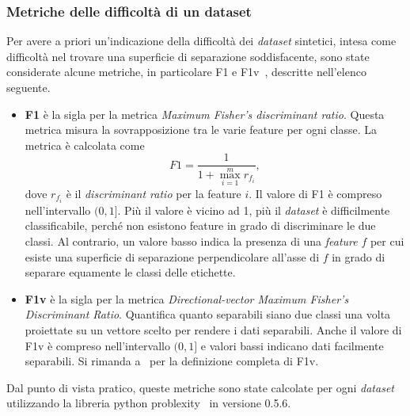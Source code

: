 \subsubsection{Metriche delle difficoltà di un dataset}\label{sec:metriche_dataset}
Per avere a priori un'indicazione della difficoltà dei \emph{dataset} sintetici, intesa come difficoltà nel trovare una superficie di separazione soddisfacente, sono state considerate alcune metriche, in particolare F1 e F1v~\cite{ds_complexity}, descritte nell'elenco seguente.
\begin{itemize}
    \item \textbf{F1} è la sigla per la metrica \emph{Maximum Fisher’s discriminant ratio}. Questa metrica misura la sovrapposizione tra le varie feature per ogni classe.
    La metrica è calcolata come
    \begin{equation*}
        F1=\frac{1}{1+\max_{i=1}^{m}r_{f_{i}}},
    \end{equation*}
    dove $r_{f_{i}}$ è il \emph{discriminant ratio} per la feature $i$.
    Il valore di F1 è compreso nell'intervallo $(0,1]$. Più il valore è vicino ad 1, più il \emph{dataset} è difficilmente classificabile, perché non esistono feature in grado di discriminare le due classi. Al contrario, un valore basso indica la presenza di una \emph{feature} $f$ per cui esiste una superficie di separazione perpendicolare all'asse di $f$ in grado di separare equamente le classi delle etichette.
    \item \textbf{F1v} è la sigla per la metrica \emph{Directional-vector Maximum Fisher’s Discriminant Ratio}. Quantifica quanto separabili siano due classi una volta proiettate su un vettore scelto per rendere i dati separabili.
    Anche il valore di F1v è compreso nell'intervallo $(0,1]$ e valori bassi indicano dati facilmente separabili.    
    Si rimanda a~\cite{ds_complexity} per la definizione completa di F1v.
\end{itemize}

Dal punto di vista pratico, queste metriche sono state calcolate per ogni \emph{dataset} utilizzando la libreria python problexity~\cite{problexity} in versione 0.5.6.


